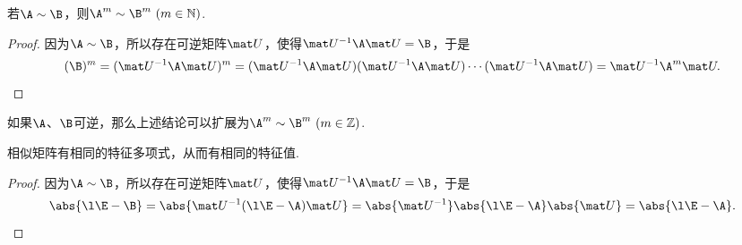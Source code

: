 \begin{property}\label{theorem:特征值与特征向量.矩阵相似的必要条件2}
若\(\A\sim\B\)，则\(\A^m \sim \B^m\ (m\in\mathbb{N})\).
\begin{proof}
因为\(\A\sim\B\)，所以存在可逆矩阵\(\P\)，使得\(\P^{-1}\A\P=\B\)，于是\[
(\B)^m = (\P^{-1}\A\P)^m
= (\P^{-1}\A\P)(\P^{-1}\A\P)\dotsb(\P^{-1}\A\P)
= \P^{-1}\A^m\P.
\qedhere
\]
\end{proof}
\end{property}
如果\(\A\)、\(\B\)可逆，那么上述结论可以扩展为\(\A^m\sim\B^m\ (m\in\mathbb{Z})\).

\begin{property}\label{theorem:特征值与特征向量.矩阵相似的必要条件3}
相似矩阵有相同的特征多项式，从而有相同的特征值.
\begin{proof}
因为\(\A\sim\B\)，所以存在可逆矩阵\(\P\)，使得\(\P^{-1}\A\P=\B\)，于是\[
\abs{\l\E-\B}=\abs{\P^{-1}(\l\E-\A)\P}=\abs{\P^{-1}}\abs{\l\E-\A}\abs{\P}=\abs{\l\E-\A}.
\qedhere
\]
\end{proof}
\end{property}


